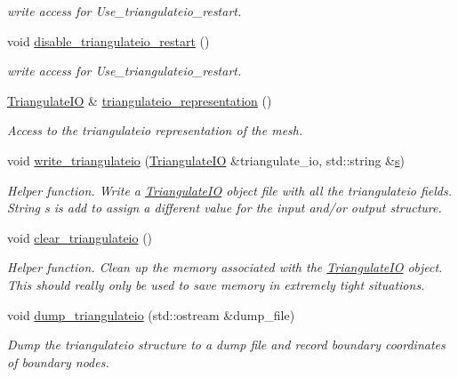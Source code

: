 \begin{DoxyCompactItemize}
\begin{DoxyCompactList}\small\item\em write access for Use\+\_\+triangulateio\+\_\+restart. \end{DoxyCompactList}\item 
void \hyperlink{classoomph_1_1TriangleMeshBase_a8f34ac9d3a8b7ee39a1134eadc47ff23}{disable\+\_\+triangulateio\+\_\+restart} ()
\begin{DoxyCompactList}\small\item\em write access for Use\+\_\+triangulateio\+\_\+restart. \end{DoxyCompactList}\item 
\hyperlink{structoomph_1_1TriangulateIO}{Triangulate\+IO} \& \hyperlink{classoomph_1_1TriangleMeshBase_a1cd134700f02b81239a7de630a496dcf}{triangulateio\+\_\+representation} ()
\begin{DoxyCompactList}\small\item\em Access to the triangulateio representation of the mesh. \end{DoxyCompactList}\item 
void \hyperlink{classoomph_1_1TriangleMeshBase_ac6bf9ce6546b2e853c3c84cd44837c31}{write\+\_\+triangulateio} (\hyperlink{structoomph_1_1TriangulateIO}{Triangulate\+IO} \&triangulate\+\_\+io, std\+::string \&\hyperlink{cfortran_8h_ab7123126e4885ef647dd9c6e3807a21c}{s})
\begin{DoxyCompactList}\small\item\em Helper function. Write a \hyperlink{structoomph_1_1TriangulateIO}{Triangulate\+IO} object file with all the triangulateio fields. String s is add to assign a different value for the input and/or output structure. \end{DoxyCompactList}\item 
void \hyperlink{classoomph_1_1TriangleMeshBase_a5108f2cdaf673454bbab831da4fbacd5}{clear\+\_\+triangulateio} ()
\begin{DoxyCompactList}\small\item\em Helper function. Clean up the memory associated with the \hyperlink{structoomph_1_1TriangulateIO}{Triangulate\+IO} object. This should really only be used to save memory in extremely tight situations. \end{DoxyCompactList}\item 
void \hyperlink{classoomph_1_1TriangleMeshBase_a3b27444232702a4bbbeb95aa9c963c07}{dump\+\_\+triangulateio} (std\+::ostream \&dump\+\_\+file)
\begin{DoxyCompactList}\small\item\em Dump the triangulateio structure to a dump file and record boundary coordinates of boundary nodes. \end{DoxyCompactList}\item 

\end{DoxyCompactItemize}
